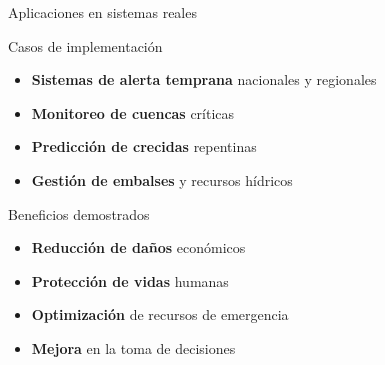 \documentclass[
  ignorenonframetext,
]{beamer}
\providecommand{\tightlist}{%
  \setlength{\itemsep}{0pt}\setlength{\parskip}{0pt}}
\begin{document}
\begin{frame}{Aplicaciones en sistemas reales}
\label{aplicaciones-en-sistemas-reales}
\begin{block}{Casos de implementación}
\label{casos-de-implementaciuxf3n}
\begin{itemize}
\tightlist
\item
  \textbf{Sistemas de alerta temprana} nacionales y regionales
\item
  \textbf{Monitoreo de cuencas} críticas
\item
  \textbf{Predicción de crecidas} repentinas
\item
  \textbf{Gestión de embalses} y recursos hídricos
\end{itemize}
\end{block}

\begin{block}{Beneficios demostrados}
\label{beneficios-demostrados}
\begin{itemize}
\tightlist
\item
  \textbf{Reducción de daños} económicos
\item
  \textbf{Protección de vidas} humanas
\item
  \textbf{Optimización} de recursos de emergencia
\item
  \textbf{Mejora} en la toma de decisiones
\end{itemize}
\end{block}
\end{frame}
\end{document}

